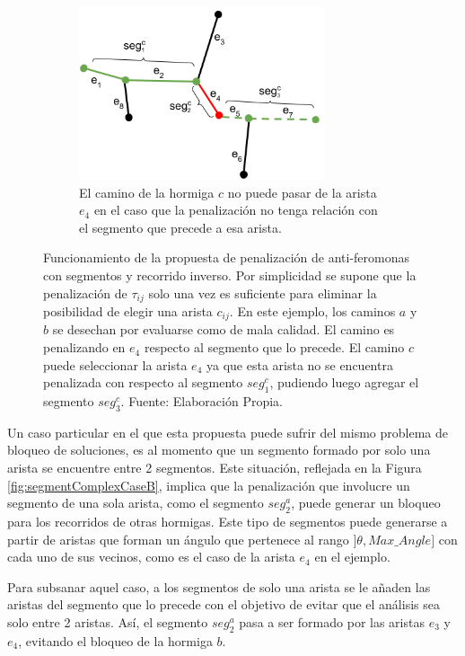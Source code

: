 \begin{figure}[t!]
    \begin{subfigure}[t]{\textwidth}
        \centering
        \includegraphics[height=2in]{imagenes/ant_segments_complex_case_block.png}
	    \caption{El camino de la hormiga $c$ no puede pasar de la arista $e_4$ en el caso que la penalizaci\'on no tenga relaci\'on con el segmento que precede a esa arista.}
        \label{fig:segmentComplexCaseBlocked}
    \end{subfigure}
    \caption[Funcionamiento de la propuesta de penalizaci\'on de anti-feromonas con segmentos y recorrido inverso.]{Funcionamiento de la propuesta de penalizaci\'on de anti-feromonas con segmentos y recorrido inverso. Por simplicidad se supone que la penalizaci\'on de $\tau_{ij}$ solo una vez es suficiente para eliminar la posibilidad de elegir una arista $c_{ij}$. En este ejemplo, los caminos $a$ y $b$ se desechan por evaluarse como de mala calidad. El camino es penalizando en $e_4$ respecto al segmento que lo precede. El camino $c$ puede seleccionar la arista $e_4$ ya que esta arista no se encuentra penalizada con respecto al segmento $seg^{c}_1$, pudiendo luego agregar el segmento $seg^{c}_3$. Fuente: Elaboraci\'on Propia.}
    \label{fig:segmentComplexCase}
\end{figure}

Un caso particular en el que esta propuesta puede sufrir del mismo problema de bloqueo de soluciones, es al momento que un segmento formado por solo una arista se encuentre entre 2 segmentos. Este situaci\'on, reflejada en la Figura \ref{fig:segmentComplexCaseB}, implica que la penalizaci\'on que involucre un segmento de una sola arista, como el segmento $seg^{a}_2$, puede generar un bloqueo para los recorridos de otras hormigas. Este tipo de segmentos puede generarse a partir de aristas que forman un \'angulo que pertenece al rango $]\theta, Max\_Angle]$ con cada uno de sus vecinos, como es el caso de la arista $e_4$ en el ejemplo.

Para subsanar aquel caso, a los segmentos de solo una arista se le a\~naden las aristas del segmento que lo precede con el objetivo de evitar que el an\'alisis sea solo entre 2 aristas. As\'i, el segmento $seg^{a}_2$ pasa a ser formado por las aristas $e_3$ y $e_4$, evitando el bloqueo de la hormiga $b$.

